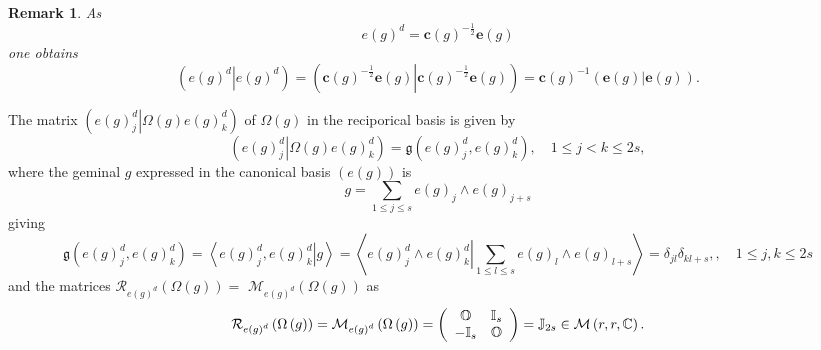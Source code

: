 \documentclass[aps,preprint]{revtex4}%
\newtheorem{remark}[theorem]{Remark}
\begin{document}
\begin{remark}
As%
\begin{equation}
e\left(  g\right)  ^{d}=\mathbf{c}\left(  g\right)  ^{-\frac{1}{2}}%
\mathbf{e}\left(  g\right)
\end{equation}
one obtains
\begin{equation}
\left(  \left.  e\left(  g\right)  ^{d}\right\vert e\left(  g\right)
^{d}\right)  =\left(  \left.  \mathbf{c}\left(  g\right)  ^{-\frac{1}{2}%
}\mathbf{e}\left(  g\right)  \right\vert \mathbf{c}\left(  g\right)
^{-\frac{1}{2}}\mathbf{e}\left(  g\right)  \right)  =\mathbf{c}\left(
g\right)  ^{-1}\left(  \left.  \mathbf{e}\left(  g\right)  \right\vert
\mathbf{e}\left(  g\right)  \right)  .
\end{equation}

\end{remark}

The matrix $\left(  \left.  e\left(  g\right)  _{j}^{d}\right\vert
\Omega\left(  g\right)  e\left(  g\right)  _{k}^{d}\right)  $ of
$\Omega\left(  g\right)  $ in the reciporical basis is given by
\begin{equation}
\left(  \left.  e\left(  g\right)  _{j}^{d}\right\vert \Omega\left(  g\right)
e\left(  g\right)  _{k}^{d}\right)  =\mathfrak{g}\left(  e\left(  g\right)
_{j}^{d},e\left(  g\right)  _{k}^{d}\right)  ,\quad1\leq j<k\leq2s,
\end{equation}
where the geminal $g$ expressed in the canonical basis $\left(  e\left(
g\right)  \right)  $ is
\begin{equation}
g=\sum_{1\leq j\leq s}e\left(  g\right)  _{j}\wedge e\left(  g\right)  _{j+s}%
\end{equation}
giving%
\begin{equation}
\mathfrak{g}\left(  e\left(  g\right)  _{j}^{d},e\left(  g\right)  _{k}%
^{d}\right)  =\left\langle \left.  e\left(  g\right)  _{j}^{d},e\left(
g\right)  _{k}^{d}\right\vert g\right\rangle =\left\langle \left.
\overset{\overset{}{}}{e\left(  g\right)  _{j}^{d}\wedge e\left(  g\right)
_{k}^{d}}\right\vert \sum_{1\leq l\leq s}e\left(  g\right)  _{l}\wedge
e\left(  g\right)  _{l+s}\right\rangle =\delta_{jl}\delta_{kl+s},,\quad1\leq
j,k\leq2s
\end{equation}
and the matrices $\mathcal{R}_{e\left(  g\right)  ^{d}}\left(  \Omega\left(
g\right)  \right)  =$ $\mathcal{M}_{e\left(  g\right)  ^{d}}\left(
\Omega\left(  g\right)  \right)  $ as
\begin{equation}
\mathcal{R}_{e\left(  g\right)  ^{d}}\left(  \Omega\left(  g\right)  \right)
=\mathcal{M}_{e\left(  g\right)  ^{d}}\left(  \Omega\left(  g\right)  \right)
=\left(
\begin{array}
[c]{cc}%
\mathbb{O} & \mathbb{I}_{s}\\
-\mathbb{I}_{s} & \mathbb{O}%
\end{array}
\right)  =\mathbb{J}_{2s}\in\mathcal{M}\left(  r,r,\mathbb{C}\right)  .
\end{equation}
\end{document}
